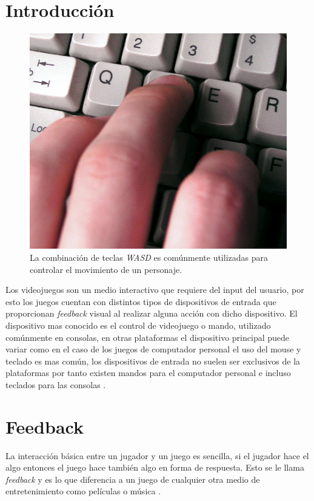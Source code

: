 \section{Introducción}
\setlength\intextsep{0pt}
\begin{figure}
\includegraphics[width=\linewidth]{media/wasd.jpg}
\caption{La combinación de teclas \emph{WASD} es comúnmente utilizadas para controlar el movimiento de un personaje.}
\label{fig:wasd}
\end{figure}
Los videojuegos son un medio interactivo que requiere del input del usuario, por esto los juegos cuentan con distintos tipos de dispositivos de entrada que proporcionan \emph{feedback} visual al realizar alguna acción con dicho dispositivo. El dispositivo mas conocido es el control de videojuego o mando, utilizado comúnmente en consolas, en otras plataformas el dispositivo principal puede variar como en el caso de los juegos de computador personal el uso del mouse y teclado es mas común, los dispositivos de entrada no suelen ser exclusivos de la plataformas por tanto existen mandos para el computador personal e incluso teclados para las consolas \cite[p.~395]{jenkinscreatinggames}.
\section{Feedback}
La interacción básica entre un jugador y un juego es sencilla, si el jugador hace el algo entonces el juego hace también algo en forma de respuesta. Esto se le llama \emph{feedback} y es lo que diferencia a un juego de cualquier otra medio de entretenimiento como películas o música \cite[p.~18]{bobbatesgamedesign}.

